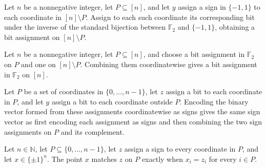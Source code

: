 \begin{definition}
\leanok
{}
Let $n$ be a nonnegative integer, let $P\subseteq[n]$, and let $y$ assign a sign in
$\{-1,1\}$ to each coordinate in $[n]\setminus P$. Assign to each such coordinate its
corresponding bit under the inverse of the standard bijection between $\mathbb F_2$ and
$\{-1,1\}$, obtaining a bit assignment on $[n]\setminus P$.
\end{definition}

\begin{definition}
\leanok
{}
Let $n$ be a nonnegative integer, let $P\subseteq[n]$, and choose a bit assignment in
$\mathbb F_2$ on $P$ and one on $[n]\setminus P$. Combining them coordinatewise gives a
bit assignment in $\mathbb F_2$ on $[n]$.
\end{definition}

\begin{theorem}
\leanok
{}
Let $P$ be a set of coordinates in $\{0,\ldots,n-1\}$, let $z$ assign a bit to each
coordinate in $P$, and let $y$ assign a bit to each coordinate outside $P$. Encoding the
binary vector formed from these assignments coordinatewise as signs gives the same sign
vector as first encoding each assignment as signs and then combining the two sign
assignments on $P$ and its complement.
\end{theorem}

\begin{definition}
\label{FABL.MatchesJuntaAssignment}
\leanok
{}
Let $n\in\mathbb N$, let $P\subseteq\{0,\ldots,n-1\}$, let $z$ assign a sign to every
coordinate in $P$, and let $x\in\{\pm1\}^n$. The point $x$ matches $z$ on $P$ exactly
when $x_i=z_i$ for every $i\in P$.
\end{definition}

